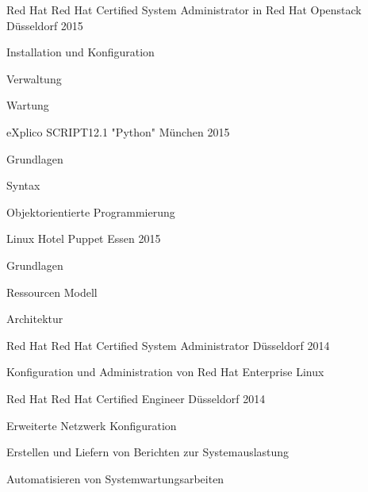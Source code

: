 \begin{cventries}
  \cventry
    {Red Hat} %
    {Red Hat Certified System Administrator in Red Hat Openstack} %
    {Düsseldorf} %
    {2015} %
    {
      \begin{cvitems} %
        \item {Installation und Konfiguration}
        \item {Verwaltung}
        \item {Wartung}
      \end{cvitems}
    }
    
  \cventry
    {eXplico} %
    {SCRIPT12.1 "Python"} %
    {München} %
    {2015} %
    {
      \begin{cvitems} %
        \item {Grundlagen}
        \item {Syntax}
        \item {Objektorientierte Programmierung}
      \end{cvitems}
    }
    
  \cventry
    {Linux Hotel} %
    {Puppet} %
    {Essen} %
    {2015} %
    {
      \begin{cvitems} %
        \item {Grundlagen}
        \item {Ressourcen Modell}
        \item {Architektur}
      \end{cvitems}
    }
     
  \cventry
    {Red Hat} %
    {Red Hat Certified System Administrator} %
    {Düsseldorf} %
    {2014} %
    {
      \begin{cvitems} %
        \item {Konfiguration und Administration von Red Hat Enterprise Linux}
      \end{cvitems}
    }

  \cventry
    {Red Hat} %
    {Red Hat Certified Engineer} %
    {Düsseldorf} %
    {2014} %
    {
      \begin{cvitems} %
        \item {Erweiterte Netzwerk Konfiguration}
        \item {Erstellen und Liefern von Berichten zur Systemauslastung}
        \item {Automatisieren von Systemwartungsarbeiten}
      \end{cvitems}
    }
    

\end{cventries}
